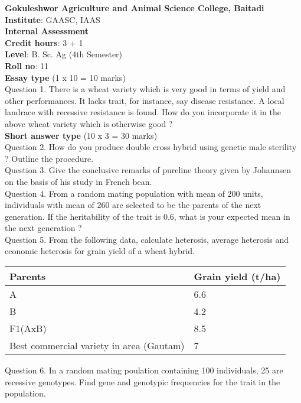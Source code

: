 \documentclass[12pt]{article}\usepackage[]{graphicx}\usepackage[]{color}
\begin{document}
{\centering \Large{\textbf{Gokuleshwor Agriculture and Animal Science College, Baitadi}} \\[0.25cm]
            \textbf{Institute}: GAASC, IAAS \\[0.2cm]
            \textbf{Internal Assessment} \\[0.2cm]} 
\textbf{Credit hours}: 3 + 1 \\ 
\textbf{Level}: B. Sc. Ag (4th Semester) \\
\textbf{Roll no}: 11 \\[0.5cm] 
\textbf{Essay type} (1 x 10 = 10 marks) \\
Question 1. There is a wheat variety which is very good in terms of yield and other performances. It lacks trait, for instance, say disease resistance. A local landrace with recessive resistance is found. How do you incorporate it in the above wheat variety which is otherwise good ?\\
\textbf{Short answer type} (10 x 3 = 30 marks) \\
Question 2. How do you produce double cross hybrid using genetic male sterility ? Outline the procedure.\\
Question 3. Give the conclusive remarks of pureline theory given by Johannsen on the basis of his study in French bean.\\
Question 4. From a random mating population with mean of 200 units, individuals with mean of 260 are selected to be the parents of the next generation. If the heritability of the trait is 0.6, what is your expected mean in the next generation ?\\
Question 5. From the following data, calculate heterosis, average heterosis and economic heterosis for grain yield of a wheat hybrid.\\ 
\begin{table}[H]
\centering\begingroup\fontsize{8}{10}\selectfont

\begin{tabular}[t]{ll}
\toprule
Parents & Grain yield (t/ha)\\
\midrule
A & 6.6\\
B & 4.2\\
F1(AxB) & 8.5\\
Best commercial variety in area (Gautam) & 7\\
\bottomrule
\end{tabular}
\endgroup{}
\end{table}
Question 6. In a random mating poulation containing 100 individuals, 25 are recessive genotypes. Find gene and genotypic frequencies for the trait in the population.\\
\end{document}
